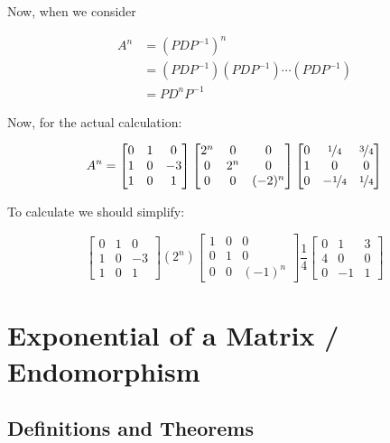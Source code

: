 \begin{sol}
\begin{enumerate}
				Now, when we consider 

				\begin{align*}
					A^n &= (PDP^{-1})^n\\
					&= (PDP^{-1})(PDP^{-1}) \cdots (PDP^{-1})\\
					&= PD^nP^{-1}
				\end{align*}

				Now, for the actual calculation:

				\[A^n = \begin{bmatrix}
					0&1&0\\1&0&-3\\1&0&1
				\end{bmatrix} \begin{bmatrix}
					2^n&0&0\\0&2^n&0\\0&0&(-2)^n
				\end{bmatrix}\begin{bmatrix}
					0&\nicefrac{1}{4}&\nicefrac{3}{4}\\
					1&0&0\\
					0&-\nicefrac{1}{4}&\nicefrac{1}{4}
				\end{bmatrix}\]

				To calculate we should simplify:

				\[\begin{bmatrix}
					0&1&0\\1&0&-3\\1&0&1
				\end{bmatrix} (2^n) \begin{bmatrix}
					1&0&0\\0&1&0\\0&0&(-1)^n
				\end{bmatrix}\frac{1}{4}\begin{bmatrix}
					0&1&3\\
					4&0&0\\
					0&-1&1
				\end{bmatrix}\]
	\end{enumerate}
\end{sol}

\section{Exponential of a Matrix / Endomorphism}

\subsection{Definitions and Theorems}

